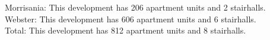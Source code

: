 {Morrisania}: This development has 206 apartment units and 2 stairhalls.\\{Webster}: This development has 606 apartment units and 6 stairhalls.\\{Total}: This development has 812 apartment units and 8 stairhalls.\\